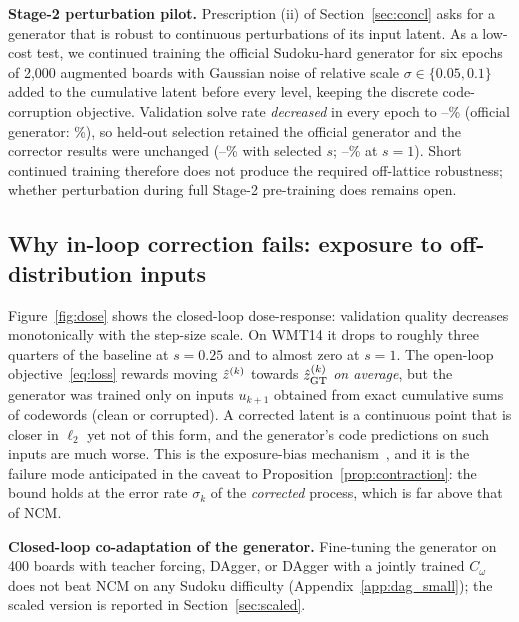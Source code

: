 \textbf{Stage-2 perturbation pilot.} Prescription (ii) of Section~\ref{sec:concl} asks for a generator that is robust to continuous perturbations of its input latent. As a low-cost test, we continued training the official Sudoku-hard generator for six epochs of 2{,}000 augmented boards with Gaussian noise of relative scale $\sigma\in\{0.05,0.1\}$ added to the cumulative latent before every level, keeping the discrete code-corruption objective. Validation solve rate \emph{decreased} in every epoch to \PtMin--\PtTenMax\% (official generator: \PtBaseVal\%), so held-out selection retained the official generator and the corrector results were unchanged (\PtLoopSelMin--\PtLoopSelMax\% with selected $s$; \PtLoopOneMin--\PtLoopOneMax\% at $s=1$). Short continued training therefore does not produce the required off-lattice robustness; whether perturbation during full Stage-2 pre-training does remains open.



\subsection{Why in-loop correction fails: exposure to off-distribution inputs}
Figure~\ref{fig:dose} shows the closed-loop dose-response: validation quality decreases monotonically with the step-size scale. On WMT14 it drops to roughly three quarters of the baseline at $s=0.25$ and to almost zero at $s=1$. The open-loop objective~\eqref{eq:loss} rewards moving $\hat{z}^{(k)}$ towards $\hat{z}^{(k)}_{\mathrm{GT}}$ \emph{on average}, but the generator was trained only on inputs $u_{k+1}$ obtained from exact cumulative sums of codewords (clean or corrupted). A corrected latent is a continuous point that is closer in $\ell_2$ yet not of this form, and the generator's code predictions on such inputs are much worse. This is the exposure-bias mechanism~\citep{bengio2015scheduled,ross2011dagger}, and it is the failure mode anticipated in the caveat to Proposition~\ref{prop:contraction}: the bound holds at the error rate $\sigma_k$ of the \emph{corrected} process, which is far above that of NCM.









\textbf{Closed-loop co-adaptation of the generator.} Fine-tuning the generator on 400 boards with teacher forcing, DAgger, or DAgger with a jointly trained $C_\omega$ does not beat NCM on any Sudoku difficulty (Appendix~\ref{app:dag_small}); the scaled version is reported in Section~\ref{sec:scaled}.

